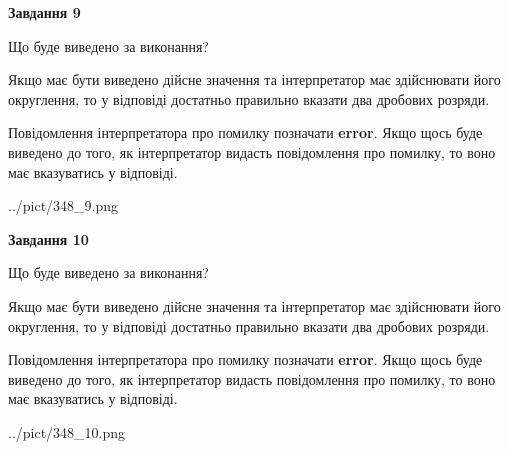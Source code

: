 \documentclass[12pt, ukrainian]{article}
\begin{document}
{\begin {Large}
{\begin {center}\textbf{Завдання 9}\end {center}}\par
Що буде виведено за виконання? \par

Якщо має бути виведено дійсне значення та інтерпретатор має здійснювати його округлення, 
то у відповіді достатньо правильно вказати два дробових розряди.

Повідомлення інтерпретатора про помилку позначати \textbf{error}.
Якщо щось буде виведено до того, як інтерпретатор видасть повідомлення про помилку, 
то воно має вказуватись у відповіді. \par

\begin{center}
	{../pict/348_9.png}
\end{center}
\newpage

{\begin {center}\textbf{Завдання 10}\end {center}}\par
Що буде виведено за виконання? \par

Якщо має бути виведено дійсне значення та інтерпретатор має здійснювати його округлення, 
то у відповіді достатньо правильно вказати два дробових розряди.

Повідомлення інтерпретатора про помилку позначати \textbf{error}.
Якщо щось буде виведено до того, як інтерпретатор видасть повідомлення про помилку, 
то воно має вказуватись у відповіді. \par

\begin{center}
	{../pict/348_10.png}
\end{center}
\newpage

\end {Large}}
\end{document}
